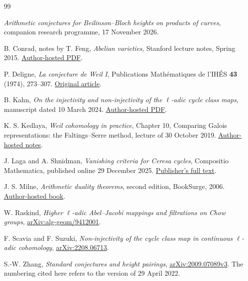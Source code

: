 \documentclass[11pt,a4paper]{article}
\theoremstyle{definition}
\numberwithin{equation}{section}
\begin{document}
\begin{thebibliography}{99}

\emph{Arithmetic conjectures for Beilinson--Bloch heights
on products of curves}, companion research programme,
17 November 2026.

B. Conrad, notes by T. Feng,
\emph{Abelian varieties}, Stanford lecture notes, Spring 2015.
\href{https://math.stanford.edu/~conrad/249CS15Page/handouts/abvarnotes.pdf}
{Author-hosted PDF}.

P. Deligne, \emph{La conjecture de Weil I},
Publications Mathématiques de l'IHÉS \textbf{43} (1974), 273--307.
\href{https://www.numdam.org/article/PMIHES_1974__43__273_0.pdf}
{Original article}.

B. Kahn, \emph{On the injectivity and non-injectivity of the
\(\ell\)-adic cycle class maps}, manuscript dated 10 March 2024.
\href{https://webusers.imj-prg.fr/~bruno.kahn/preprints/ladic-cycle-class-rev3.pdf}
{Author-hosted PDF}.

K. S. Kedlaya, \emph{Weil cohomology in practice},
Chapter 10, Comparing Galois representations: the Faltings--Serre
method, lecture of 30 October 2019.
\href{https://kskedlaya.org/weil-cohom/chapter-10.html}
{Author-hosted notes}.

J. Laga and A. Shnidman, \emph{Vanishing criteria for Ceresa cycles},
Compositio Mathematica, published online 29 December 2025.
\href{https://www.cambridge.org/core/journals/compositio-mathematica/article/vanishing-criteria-for-ceresa-cycles/051A1B2257FB703EA13086A238A279B8}
{Publisher's full text}.

J. S. Milne, \emph{Arithmetic duality theorems}, second edition,
BookSurge, 2006.
\href{https://jmilne.org/math/Books/ADTnot.pdf}{Author-hosted book}.

W. Raskind, \emph{Higher \(\ell\)-adic Abel--Jacobi mappings and
filtrations on Chow groups},
\href{https://arxiv.org/abs/alg-geom/9412001}{arXiv:alg-geom/9412001}.

F. Scavia and F. Suzuki,
\emph{Non-injectivity of the cycle class map in continuous
\(\ell\)-adic cohomology},
\href{https://arxiv.org/abs/2208.06713}{arXiv:2208.06713}.

S.-W. Zhang, \emph{Standard conjectures and height pairings},
\href{https://arxiv.org/abs/2009.07089v3}{arXiv:2009.07089v3}.
The numbering cited here refers to the version of 29 April 2022.

\end{thebibliography}
\end{document}
